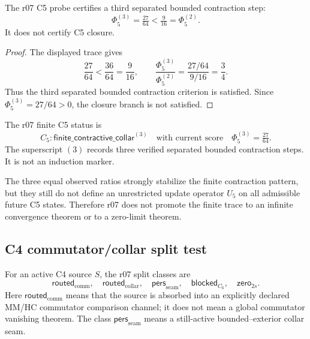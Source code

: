 \begin{lemma}
\label{lem:v470-r07-third-c5-bounded-contraction}
The r07 C5 probe certifies a third separated bounded contraction step:
\[
\Phi_5^{(3)}=\tfrac{27}{64}<\tfrac{9}{16}=\Phi_5^{(2)}.
\]
It does not certify C5 closure.
\end{lemma}

\begin{proof}
The displayed trace gives
\[
\frac{27}{64}<\frac{36}{64}=\frac{9}{16},
\qquad
\frac{\Phi_5^{(3)}}{\Phi_5^{(2)}}
=
\frac{27/64}{9/16}
=
\frac34.
\]
Thus the third separated bounded contraction criterion is satisfied.  Since
\(\Phi_5^{(3)}=27/64>0\), the closure branch is not satisfied.
\end{proof}

\begin{definition}
\label{def:v470-r07-finite-c5-status}
The r07 finite C5 status is
\[
C_5:
\mathsf{finite\_contractive\_collar}^{(3)}
\quad\text{with current score}\quad
\Phi_5^{(3)}=\tfrac{27}{64}.
\]
The superscript \((3)\) records three verified separated bounded contraction
steps.  It is not an induction marker.
\end{definition}

\begin{remark}
\label{rem:v470-r07-still-no-infinite-convergence-theorem}
The three equal observed ratios strongly stabilize the finite contraction
pattern, but they still do not define an unrestricted update operator
\(U_5\) on all admissible future C5 states.  Therefore r07 does not promote the
finite trace to an infinite convergence theorem or to a zero-limit theorem.
\end{remark}

\subsection{C4 commutator/collar split test}
\label{subsec:v470-r07-c4-commutator-collar-split-test}

\begin{definition}
\label{def:v470-r07-c4-split-alphabet}
For an active C4 source \(S\), the r07 split classes are
\[
\mathsf{routed}_{\mathrm{comm}},\quad
\mathsf{routed}_{\mathrm{collar}},\quad
\mathsf{pers}_{\mathrm{seam}},\quad
\mathsf{blocked}_{C_6},\quad
\mathsf{zero}_{2s}.
\]
Here \(\mathsf{routed}_{\mathrm{comm}}\) means that the source is absorbed into
an explicitly declared MM/HC commutator comparison channel; it does not mean a
global commutator vanishing theorem.  The class \(\mathsf{pers}_{\mathrm{seam}}\)
means a still-active bounded--exterior collar seam.
\end{definition}

